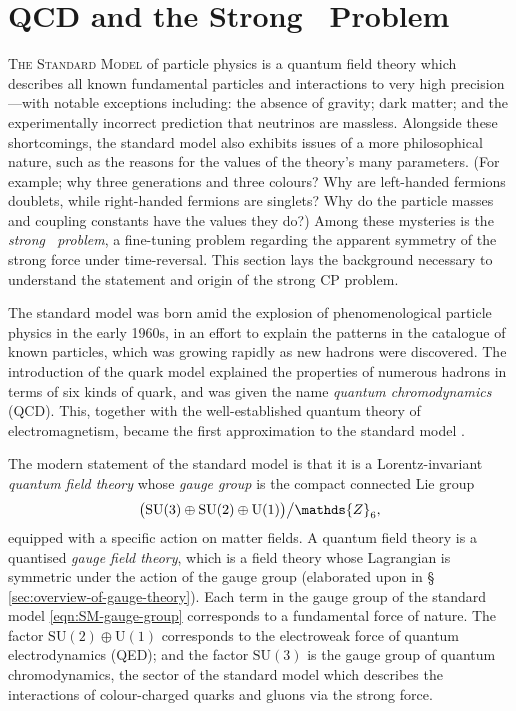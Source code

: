 \chapter{QCD and the Strong \CP\ Problem}

\textsc{The Standard Model} of particle physics is a quantum field theory which describes all known fundamental particles and interactions to very high precision---with notable exceptions including:
the absence of gravity;
dark matter;
and the experimentally incorrect prediction that neutrinos are massless.
Alongside these shortcomings, the standard model also exhibits issues of a more philosophical nature, such as the reasons for the values of the theory's many parameters. (For example; why three generations and three colours? Why are left-handed fermions doublets, while right-handed fermions are singlets? Why do the particle masses and coupling constants have the values they do?)
Among these mysteries is the \emph{strong \CP\ problem}, a fine-tuning problem regarding the apparent symmetry of the strong force under time-reversal.
This section lays the background necessary to understand the statement and origin of the strong CP problem.

The standard model was born amid the explosion of phenomenological particle physics in the early 1960s, in an effort to explain the patterns in the catalogue of known particles, which was growing rapidly as new hadrons were discovered.
The introduction of the quark model explained the properties of numerous hadrons in terms of six kinds of quark, and was given the name \emph{quantum chromodynamics} (QCD). This, together with the well-established quantum theory of electromagnetism, became the first approximation to the standard model \cite{Weinberg_2004-history}.

The modern statement of the standard model is that it is a Lorentz-invariant \emph{quantum field theory} whose \emph{gauge group} is the compact connected Lie group
\begin{align}
	\qty\big(\mathrm{SU}(3)\oplus\mathrm{SU}(2)\oplus\mathrm{U}(1))\big/\mathds{Z}_6
	\label{eqn:SM-gauge-group}
,\end{align}
equipped with a specific action on matter fields.
A quantum field theory is a quantised \emph{gauge field theory}, which is a field theory whose Lagrangian is symmetric under the action of the gauge group (elaborated upon in §\,\ref{sec:overview-of-gauge-theory}).
Each term in the gauge group of the standard model \eqref{eqn:SM-gauge-group} corresponds to a fundamental force of nature.
The factor $\mathrm{SU}(2)\oplus\mathrm{U}(1)$ corresponds to the electroweak force of quantum electrodynamics (QED); and the factor $\mathrm{SU}(3)$ is the gauge group of quantum chromodynamics, the sector of the standard model which describes the interactions of colour-charged quarks and gluons via the strong force.

